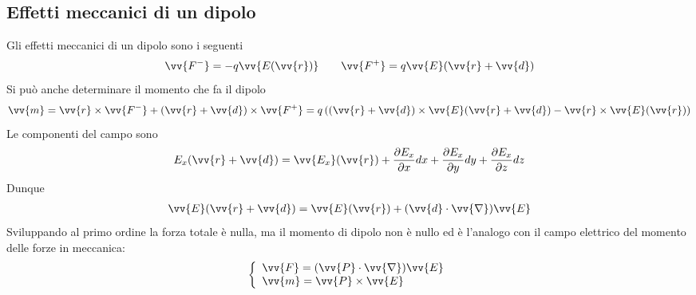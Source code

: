 \documentclass[a4paper, oneside]{article}
\begin{document}
\subsection{Effetti meccanici di un dipolo}
Gli effetti meccanici di un dipolo sono i seguenti
\begin{gather*}
    \vv{F^{-}} = -q\vv{E(\vv{r} )}   \qquad \vv{F^{+}} = q\vv{E}(\vv{r} + \vv{d}  )  
\end{gather*}
Si può anche determinare il momento che fa il dipolo
\begin{gather*}
    \vv{m} = \vv{r} \times \vv{F^{-}} + (\vv{r} + \vv{d})  \times \vv{F^{+}} = q\left((\vv{r} + \vv{d}  ) \times \vv{E}(\vv{r} + \vv{d}  ) - \vv{r} \times \vv{E}(\vv{r} )  \right)
\end{gather*}
Le componenti del campo sono 
\begin{gather*}
    E_x(\vv{r} + \vv{d}  ) = \vv{E_x} (\vv{r} ) + \frac{\partial E_x}{\partial x} dx + \frac{\partial E_x}{\partial y} dy + \frac{\partial E_x}{\partial z} dz   
\end{gather*}
Dunque
\begin{gather*}
    \vv{E}(\vv{r} + \vv{d}  ) = \vv{E}(\vv{r} ) + (\vv{d} \cdot \vv{\nabla}  )  \vv{E} 
\end{gather*}
Sviluppando al primo ordine la forza totale è nulla, ma il momento di dipolo 
non è nullo ed è l'analogo con il campo elettrico del momento delle forze in meccanica:
\begin{gather*}
    \left\{\begin{array}{l}
        \vv{F} = (\vv{P} \cdot \vv{\nabla}  ) \vv{E} \\
        \vv{m} = \vv{P} \times \vv{E}     
    \end{array}\right.
\end{gather*}
\end{document}
